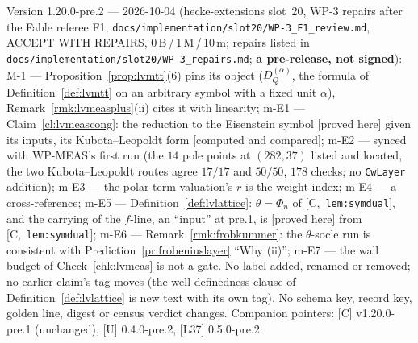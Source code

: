 \documentclass[11pt]{article}
\theoremstyle{remark}
\newcommand{\HA}[1]{[C,~\texttt{#1}]}      %
\newcommand{\PROVED}{\textsf{[proved here]}}
\newcommand{\CMPD}{\textsf{[computed and compared]}}   %
\begin{document}
Version 1.20.0-pre.2 --- 2026-10-04 (hecke-extensions slot~20, WP-3 repairs after the Fable referee F1, \texttt{docs/implementation/slot20/WP-3\_F1\_review.md},
ACCEPT WITH REPAIRS, 0\,B\,/\,1\,M\,/\,10\,m; repairs listed in \texttt{docs/implementation/slot20/WP-3\_repairs.md}; \textbf{a pre-release, not signed}): M-1 --- Proposition~\ref{prop:lvmtt}(6)
pins its object ($D^{(\alpha)}_Q$, the formula of Definition~\ref{def:lvmtt} on an arbitrary symbol with a fixed unit $\alpha$), Remark~\ref{rmk:lvmeasplus}(ii) cites it with linearity;
m-E1 --- Claim~\ref{cl:lvmeascong}: the reduction to the Eisenstein symbol \PROVED{} given its inputs, its Kubota--Leopoldt form \CMPD; m-E2 --- synced with WP-MEAS's first run (the $14$
pole points at $(282,37)$ listed and located, the two Kubota--Leopoldt routes agree $17/17$ and $50/50$, $178$ checks; no \texttt{CwLayer} addition); m-E3 --- the polar-term valuation's $r$ is the
weight index; m-E4 --- a cross-reference; m-E5 --- Definition~\ref{def:lvlattice}: $\theta=\Phi_n$ of \HA{lem:symdual}, and the carrying of the $f$-line, an ``input'' at pre.1, is \PROVED{} from
\HA{lem:symdual}; m-E6 --- Remark~\ref{rmk:frobkummer}: the $\theta$-socle run is consistent with Prediction~\ref{pr:frobeniuslayer} ``Why (ii)''; m-E7 --- the wall budget of
Check~\ref{chk:lvmeas} is not a gate. No label added, renamed or removed; no earlier claim's tag moves (the well-definedness clause of Definition~\ref{def:lvlattice} is new text with
its own tag). No schema key, record key, golden line, digest or census verdict changes. Companion pointers: [C] v1.20.0-pre.1 (unchanged), [U] 0.4.0-pre.2, [L37] 0.5.0-pre.2.
\end{document}
